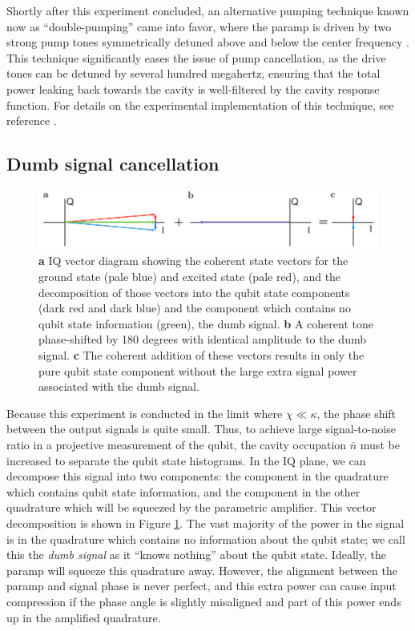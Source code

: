 Shortly after this experiment concluded, an alternative pumping technique known now as ``double-pumping'' came into favor, where the paramp is driven by two strong pump tones symmetrically detuned above and below the center frequency \cite{PhysRevB.79.184301}.  This technique significantly eases the issue of pump cancellation, as the drive tones can be detuned by several hundred megahertz, ensuring that the total power leaking back towards the cavity is well-filtered by the cavity response function.  For details on the experimental implementation of this technique, see reference \cite{Weber2014a}.


\subsection{Dumb signal cancellation}

\begin{figure}
\begin{center}
	\includegraphics[width = 6in]{qfb_exp_chapter/dumb_sig}
\end{center}
\caption[Dumb signal cancellation]{\textbf{a} IQ vector diagram showing the coherent state vectors for the ground state (pale blue) and excited state (pale red), and the decomposition of those vectors into the qubit state components (dark red and dark blue) and the component which contains no qubit state information (green), the dumb signal.  \textbf{b} A coherent tone phase-shifted by 180 degrees with identical amplitude to the dumb signal.  \textbf{c} The coherent addition of these vectors results in only the pure qubit state component without the large extra signal power associated with the dumb signal.}
\label{fig:dumb_sig}
\end{figure}

Because this experiment is conducted in the limit where $\chi \ll \kappa$, the phase shift between the output signals is quite small.  Thus, to achieve large signal-to-noise ratio in a projective measurement of the qubit, the cavity occupation $\bar{n}$ must be increased to separate the qubit state histograms.  In the IQ plane, we can decompose this signal into two components: the component in the quadrature which contains qubit state information, and the component in the other quadrature which will be squeezed by the parametric amplifier.  This vector decomposition is shown in Figure \ref{fig:dumb_sig}.  The vast majority of the power in the signal is in the quadrature which contains no information about the qubit state; we call this the \textit{dumb signal} as it ``knows nothing'' about the qubit state.  Ideally, the paramp will squeeze this quadrature away.  However, the alignment between the paramp and signal phase is never perfect, and this extra power can cause input compression if the phase angle is slightly misaligned and part of this power ends up in the amplified quadrature.

